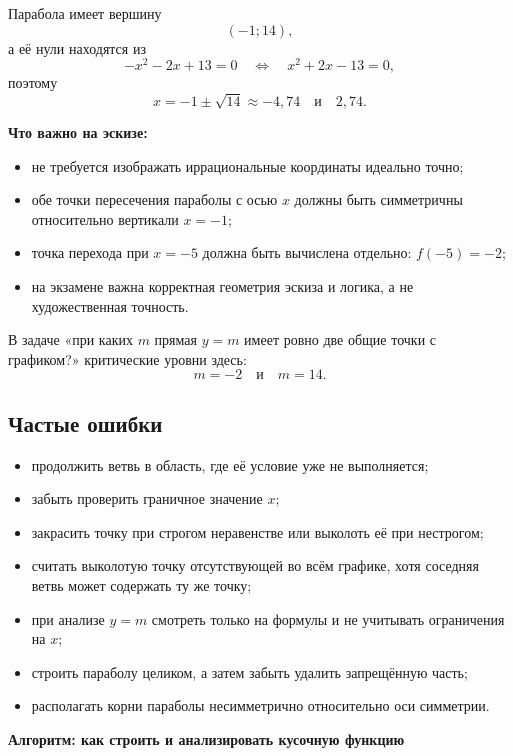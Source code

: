 \documentclass[a4paper,12pt]{article}
\newcommand{\key}[1]{\textbf{\color{darkaccent}#1}}
\begin{document}
Парабола имеет вершину
\[
(-1;14),
\]
а её нули находятся из
\[
-x^2-2x+13=0\quad\Longleftrightarrow\quad x^2+2x-13=0,
\]
поэтому
\[
x=-1\pm\sqrt{14}\approx -4{,}74\quad\text{и}\quad 2{,}74.
\]

\key{Что важно на эскизе:}
\begin{itemize}
  \item не требуется изображать иррациональные координаты идеально точно;
  \item обе точки пересечения параболы с осью $x$ должны быть симметричны относительно вертикали $x=-1$;
  \item точка перехода при $x=-5$ должна быть вычислена отдельно: $f(-5)=-2$;
  \item на экзамене важна корректная геометрия эскиза и логика, а не художественная точность.
\end{itemize}

В задаче «при каких $m$ прямая $y=m$ имеет ровно две общие точки с графиком?» критические уровни здесь:
\[
\boxed{m=-2\quad\text{и}\quad m=14}.
\]

\subsection*{Частые ошибки}
\begin{itemize}[itemsep=0.5pt,topsep=1pt]
  \item продолжить ветвь в область, где её условие уже не выполняется;
  \item забыть проверить граничное значение $x$;
  \item закрасить точку при строгом неравенстве или выколоть её при нестрогом;
  \item считать выколотую точку отсутствующей во всём графике, хотя соседняя ветвь может содержать ту же точку;
  \item при анализе $y=m$ смотреть только на формулы и не учитывать ограничения на $x$;
  \item строить параболу целиком, а затем забыть удалить запрещённую часть;
  \item располагать корни параболы несимметрично относительно оси симметрии.
\end{itemize}

\clearpage
\thispagestyle{plain}
\begin{center}
{\Large\bfseries\color{darkaccent}Алгоритм: как строить и анализировать кусочную функцию}
\end{center}
\vspace{5mm}
\end{document}

